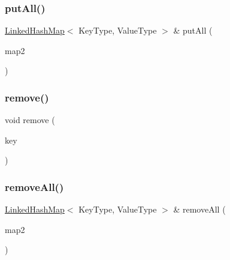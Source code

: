 \subsubsection{\texorpdfstring{put\+All()}{putAll()}}
{\footnotesize\ttfamily \mbox{\hyperlink{classLinkedHashMap}{Linked\+Hash\+Map}}$<$ Key\+Type, Value\+Type $>$ \& put\+All (\begin{DoxyParamCaption}\item[{const \mbox{\hyperlink{classLinkedHashMap}{Linked\+Hash\+Map}}$<$ Key\+Type, Value\+Type $>$ \&}]{map2 }\end{DoxyParamCaption})}

\mbox{\label{classLinkedHashMap_ac6e7e5198a9f1c8b2cc40fbd1d0eb3b0}} 
\subsubsection{\texorpdfstring{remove()}{remove()}}
{\footnotesize\ttfamily void remove (\begin{DoxyParamCaption}\item[{const Key\+Type \&}]{key }\end{DoxyParamCaption})}

\mbox{\label{classLinkedHashMap_a192b64f541a02885811d43505ac99d6f}} 
\subsubsection{\texorpdfstring{remove\+All()}{removeAll()}}
{\footnotesize\ttfamily \mbox{\hyperlink{classLinkedHashMap}{Linked\+Hash\+Map}}$<$ Key\+Type, Value\+Type $>$ \& remove\+All (\begin{DoxyParamCaption}\item[{const \mbox{\hyperlink{classLinkedHashMap}{Linked\+Hash\+Map}}$<$ Key\+Type, Value\+Type $>$ \&}]{map2 }\end{DoxyParamCaption})}

\mbox{\label{classLinkedHashMap_a9bcc3af0a0717671f5bf22f2c886f7ff}} 
